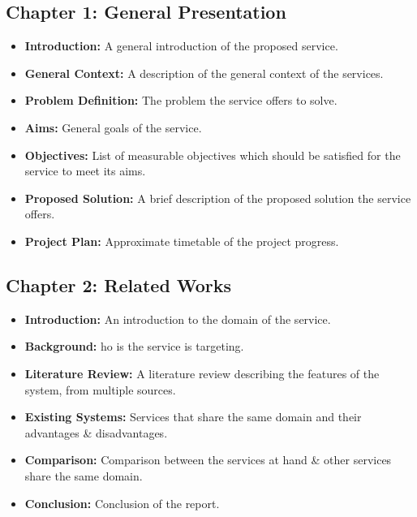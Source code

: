 \documentclass{article}
\begin{document}
\subsection{Chapter 1: General Presentation} 
\begin{itemize}
    \item \textbf{Introduction:} A general introduction of the proposed service.
    \item \textbf{General Context:} A description of the general context of the services.      
    \item \textbf{Problem Definition:} The problem the service offers to solve.
    \item \textbf{Aims:} General goals of the service.
    \item \textbf{Objectives:} List of measurable objectives which should be satisfied for the service to meet its aims.
    \item \textbf{Proposed Solution:} A brief description of the proposed solution the service offers.
    \item \textbf{Project Plan:} Approximate timetable of the project progress.
\end{itemize}
\subsection{Chapter 2: Related Works}
\begin{itemize}
    \item \textbf{Introduction:} An introduction to the domain of the service.
    \item \textbf{Background:} ho is the service is targeting.
    \item \textbf{Literature Review:} A literature review describing the features of the system, from multiple sources.
    \item \textbf{Existing Systems:} Services that share the same domain and their advantages \& disadvantages.
    \item \textbf{Comparison:} Comparison between the services at hand \& other services share the same domain.
    \item \textbf{Conclusion:} Conclusion of the report.
\end{itemize}
\end{document}
